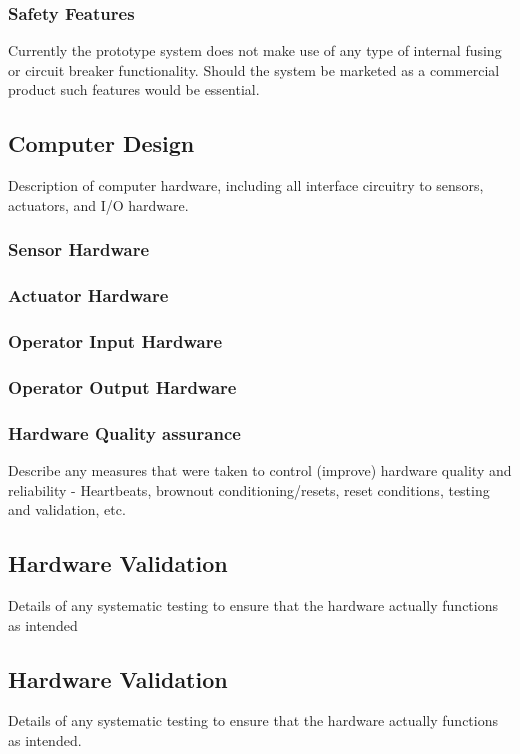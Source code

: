 \documentclass[]{report}
\begin{document}
\subsubsection{Safety Features}
Currently the prototype system does not make use of any type of internal fusing or circuit breaker functionality. Should the system be marketed as a commercial product such features would be essential.

\subsection{Computer Design}
Description of computer hardware, including all interface circuitry to sensors, actuators, and I/O hardware.

\subsubsection{Sensor Hardware}

\subsubsection{Actuator Hardware}

\subsubsection{Operator Input Hardware}

\subsubsection{Operator Output Hardware}

\subsubsection{Hardware Quality assurance}
Describe any measures that were taken to control (improve) hardware quality and reliability - Heartbeats, brownout conditioning/resets, reset conditions, testing and validation, etc.

\subsection{Hardware Validation}
Details of any systematic testing to ensure that the hardware actually functions as intended

\subsection{Hardware Validation}
Details of any systematic testing to ensure that the hardware actually functions as intended.
\end{document}
